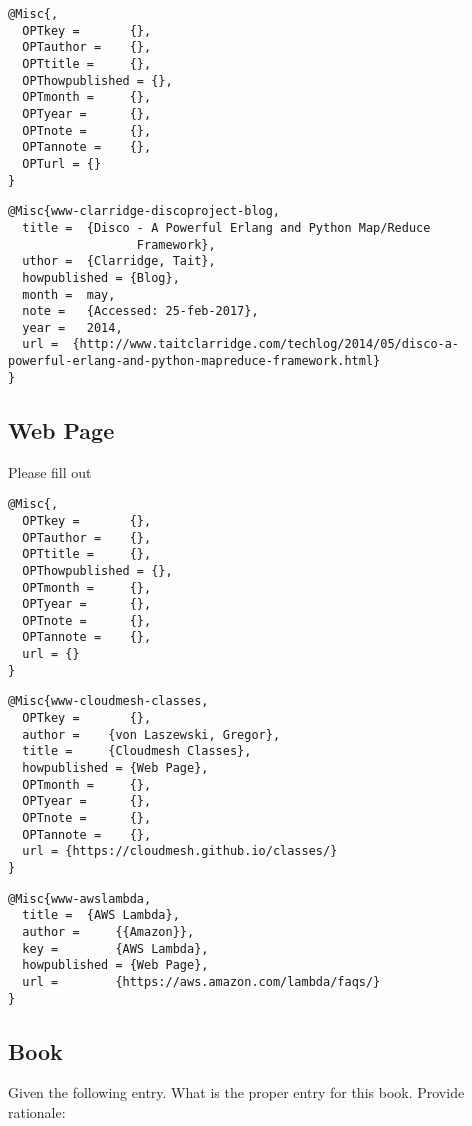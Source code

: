 \begin{verbatim}
@Misc{,
  OPTkey =       {},
  OPTauthor =    {},
  OPTtitle =     {},
  OPThowpublished = {},
  OPTmonth =     {},
  OPTyear =      {},
  OPTnote =      {},
  OPTannote =    {},
  OPTurl = {}
}
\end{verbatim}

\begin{verbatim}
@Misc{www-clarridge-discoproject-blog,
  title =  {Disco - A Powerful Erlang and Python Map/Reduce
                  Framework},
  uthor =  {Clarridge, Tait},
  howpublished = {Blog},
  month =  may,
  note =   {Accessed: 25-feb-2017},
  year =   2014,
  url =  {http://www.taitclarridge.com/techlog/2014/05/disco-a-powerful-erlang-and-python-mapreduce-framework.html}
}
\end{verbatim}

\subsection{Web Page}\label{s:e:web-page}

Please fill out

\begin{verbatim}
@Misc{, 
  OPTkey =       {}, 
  OPTauthor =    {}, 
  OPTtitle =     {}, 
  OPThowpublished = {}, 
  OPTmonth =     {}, 
  OPTyear =      {}, 
  OPTnote =      {},
  OPTannote =    {},
  url = {}
}
\end{verbatim}

\begin{verbatim}
@Misc{www-cloudmesh-classes,
  OPTkey =       {},
  author =    {von Laszewski, Gregor},
  title =     {Cloudmesh Classes},
  howpublished = {Web Page},
  OPTmonth =     {},
  OPTyear =      {},
  OPTnote =      {},
  OPTannote =    {},
  url = {https://cloudmesh.github.io/classes/}
}
\end{verbatim}

\begin{verbatim}
@Misc{www-awslambda,
  title =  {AWS Lambda},
  author =     {{Amazon}},
  key =        {AWS Lambda},
  howpublished = {Web Page},
  url =        {https://aws.amazon.com/lambda/faqs/}
}
\end{verbatim}

\subsection{Book}\label{s:e:book}

Given the following entry. What is the proper entry for this book.
Provide rationale:

